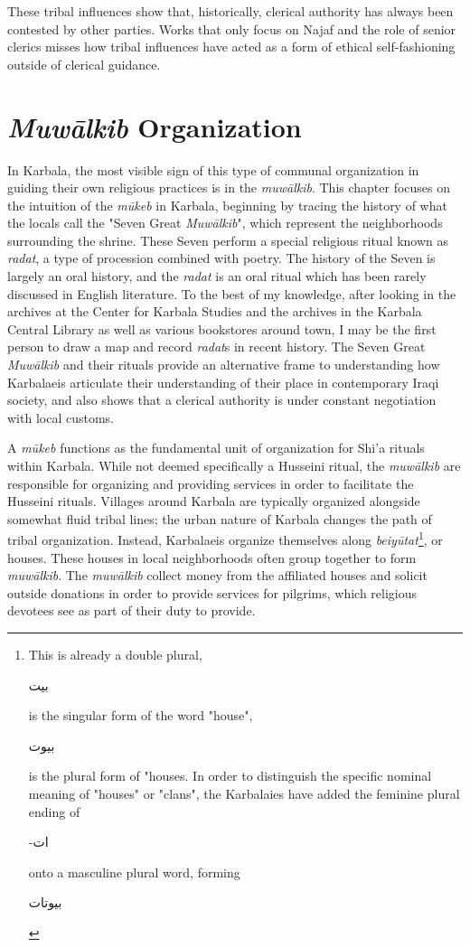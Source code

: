 These tribal influences show that, historically, clerical authority has always been contested by other parties. Works that only focus on Najaf and the role of senior clerics misses how tribal influences have acted as a form of ethical self-fashioning outside of clerical guidance. 


\section{\emph{Muwālkib} Organization}
In Karbala, the most visible sign of this type of communal organization in guiding their own religious practices is in the \emph{muwālkib}. This chapter focuses on the intuition of the \emph{mūkeb} in Karbala, beginning by tracing the history of what the locals call the "Seven Great \emph{Muwālkib}", which represent the neighborhoods surrounding the shrine. These Seven perform a special religious ritual known as \emph{radat}, a type of procession combined with poetry. The history of the Seven is largely an oral history, and the \emph{radat} is an oral ritual which has been rarely discussed in English literature. To the best of my knowledge, after looking in the archives at the Center for Karbala Studies and the archives in the Karbala Central Library as well as various bookstores around town, I may be the first person to draw a map and record \emph{radat}s in recent history. The Seven Great \emph{Muwālkib} and their rituals provide an alternative frame to understanding how Karbalaeis articulate their understanding of their place in contemporary Iraqi society, and also shows that a clerical authority is under constant negotiation with local customs. 

A \emph{mūkeb} functions as the fundamental unit of organization for Shi’a rituals within Karbala. While not deemed specifically a Husseini ritual, the \emph{muwālkib} are responsible for organizing and providing services in order to facilitate the Husseini rituals. Villages around Karbala are typically organized alongside somewhat fluid tribal lines; the urban nature of Karbala changes the path of tribal organization. Instead, Karbalaeis organize themselves along \emph{beiyūtat}\footnote{This is already a double plural, \begin{Arabic}بيت\end{Arabic} is the singular form of the word "house", \begin{Arabic}
    بيوت
\end{Arabic} is the plural form of "houses. In order to distinguish the specific nominal meaning of "houses" or "clans", the Karbalaies have added the feminine plural ending of \begin{Arabic}
    -ات
\end{Arabic} onto a masculine plural word, forming \begin{Arabic}
    بيوتات
\end{Arabic}}, or houses. These houses in local neighborhoods often group together to form \emph{muwālkib}. The \emph{muwālkib} collect money from the affiliated houses and solicit outside donations in order to provide services for pilgrims, which religious devotees see as part of their duty to provide. 

